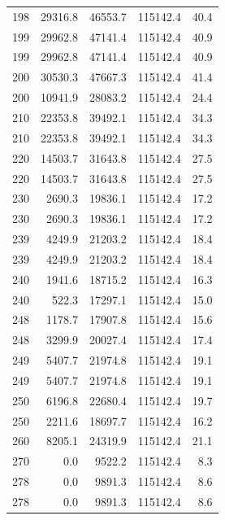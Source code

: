 \begin{longtable}{rrrrr}
    198 & \num{29316.8} & \num{46553.7} & \num{115142.4} & 40.4 \\
    199 & \num{29962.8} & \num{47141.4} & \num{115142.4} & 40.9 \\
    199 & \num{29962.8} & \num{47141.4} & \num{115142.4} & 40.9 \\
    200 & \num{30530.3} & \num{47667.3} & \num{115142.4} & 41.4 \\
    200 & \num{10941.9} & \num{28083.2} & \num{115142.4} & 24.4 \\
    210 & \num{22353.8} & \num{39492.1} & \num{115142.4} & 34.3 \\
    210 & \num{22353.8} & \num{39492.1} & \num{115142.4} & 34.3 \\
    220 & \num{14503.7} & \num{31643.8} & \num{115142.4} & 27.5 \\
    220 & \num{14503.7} & \num{31643.8} & \num{115142.4} & 27.5 \\
    230 & \num{2690.3} & \num{19836.1} & \num{115142.4} & 17.2 \\
    230 & \num{2690.3} & \num{19836.1} & \num{115142.4} & 17.2 \\
    239 & \num{4249.9} & \num{21203.2} & \num{115142.4} & 18.4 \\
    239 & \num{4249.9} & \num{21203.2} & \num{115142.4} & 18.4 \\
    240 & \num{1941.6} & \num{18715.2} & \num{115142.4} & 16.3 \\
    240 & \num{522.3} & \num{17297.1} & \num{115142.4} & 15.0 \\
    248 & \num{1178.7} & \num{17907.8} & \num{115142.4} & 15.6 \\
    248 & \num{3299.9} & \num{20027.4} & \num{115142.4} & 17.4 \\
    249 & \num{5407.7} & \num{21974.8} & \num{115142.4} & 19.1 \\
    249 & \num{5407.7} & \num{21974.8} & \num{115142.4} & 19.1 \\
    250 & \num{6196.8} & \num{22680.4} & \num{115142.4} & 19.7 \\
    250 & \num{2211.6} & \num{18697.7} & \num{115142.4} & 16.2 \\
    260 & \num{8205.1} & \num{24319.9} & \num{115142.4} & 21.1 \\
    270 & \num{0.0} & \num{9522.2} & \num{115142.4} & 8.3 \\
    278 & \num{0.0} & \num{9891.3} & \num{115142.4} & 8.6 \\
    278 & \num{0.0} & \num{9891.3} & \num{115142.4} & 8.6 \\

\end{longtable}
